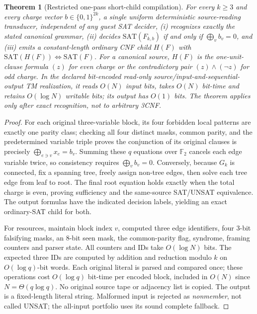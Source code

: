 \documentclass[11pt]{article}
\newtheorem{theorem}{Theorem}
\newcommand{\SAT}{\mathrm{SAT}}
\begin{document}
\begin{theorem}[Restricted one-pass short-child compilation]
For every $k\ge3$ and every charge vector $b\in\{0,1\}^{2k}$, a single uniform deterministic source-reading transducer, independent of any guest SAT decider, (i) recognizes exactly the stated canonical grammar, (ii) decides $\SAT(F_{k,b})$ if and only if $\bigoplus_v b_v=0$, and (iii) emits a constant-length ordinary CNF child $H(F)$ with $\SAT(H(F))\Longleftrightarrow\SAT(F)$. For a canonical source, $H(F)$ is the one-unit-clause formula $(z)$ for even charge or the contradictory pair $(z)\wedge(\neg z)$ for odd charge. In the declared bit-encoded read-only source/input-and-sequential-output TM realization, it reads $O(N)$ input bits, takes $O(N)$ bit-time and retains $O(\log N)$ writable bits; its output has $O(1)$ bits. The theorem applies \emph{only after exact recognition}, not to arbitrary 3CNF.
\end{theorem}
\begin{proof}
For each original three-variable block, its four forbidden local patterns are exactly one parity class; checking all four distinct masks, common parity, and the predetermined variable triple proves the conjunction of its original clauses is precisely $\bigoplus_{e\ni v}x_e=b_v$. Summing these $q$ equations over $\mathbb F_2$ cancels each edge variable twice, so consistency requires $\bigoplus_v b_v=0$. Conversely, because $G_k$ is connected, fix a spanning tree, freely assign non-tree edges, then solve each tree edge from leaf to root. The final root equation holds exactly when the total charge is even, proving sufficiency and the same-source SAT/UNSAT equivalence. The output formulas have the indicated decision labels, yielding an exact ordinary-SAT child for both.

For resources, maintain block index $v$, computed three edge identifiers, four 3-bit falsifying masks, an 8-bit seen mask, the common-parity flag, syndrome, framing counters and parser state. All counters and IDs take $O(\log N)$ bits. The expected three IDs are computed by addition and reduction modulo $k$ on $O(\log q)$-bit words. Each original literal is parsed and compared once; these operations cost $O(\log q)$ bit-time per encoded block, included in $O(N)$ since $N=\Theta(q\log q)$. No original source tape or adjacency list is copied. The output is a fixed-length literal string. Malformed input is rejected as \emph{nonmember}, not called UNSAT; the all-input portfolio uses its sound complete fallback.\qedhere
\end{proof}
\end{document}
